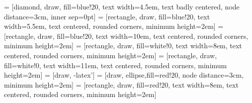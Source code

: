 \documentclass{article}
\begin{document}
\pagestyle{empty}


 = [diamond, draw, fill=blue!20, 
    text width=4.5em, text badly centered, node distance=3cm, inner sep=0pt]
 = [rectangle, draw, fill=blue!20, 
    text width=5.5em, text centered, rounded corners, minimum height=2em]
 = [rectangle, draw, fill=blue!20, 
    text width=10em, text centered, rounded corners, minimum height=2em]
 = [rectangle, draw, fill=white!0, 
    text width=8em, text centered, rounded corners, minimum height=2em]
 = [rectangle, draw, fill=white!0, 
    text width=11em, text centered, rounded corners, minimum height=2em]
 = [draw, -latex']
 = [draw, ellipse,fill=red!20, node distance=3cm,
    minimum height=2em]
 = [rectangle, draw, fill=red!20, 
    text width=8em, text centered, rounded corners, minimum height=2em]
    
\end{document}
